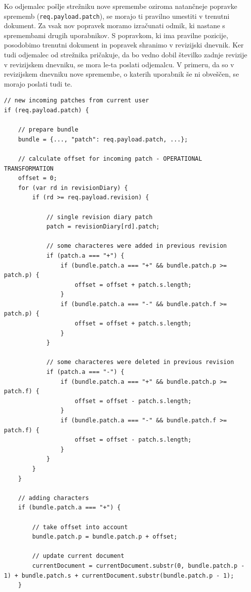 \documentclass[a4paper, 12pt, twoside]{book}
\begin{document}
Ko odjemalec pošlje strežniku nove spremembe oziroma natančneje popravke sprememb ({\tt req.payload.patch}), se morajo ti pravilno umestiti v trenutni dokument. Za vsak nov popravek moramo izračunati odmik, ki nastane s spremembami drugih uporabnikov. S popravkom, ki ima pravilne pozicije, posodobimo trenutni dokument in popravek shranimo v revizijski dnevnik. Ker tudi odjemalec od strežnika pričakuje, da bo vedno dobil številko zadnje revizije v revizijskem dnevniku, se mora le-ta poslati odjemalcu. V primeru, da so v revizijskem dnevniku nove spremembe, o katerih uporabnik še ni obveščen, se morajo poslati tudi te.\newline

\begin{lstlisting}[title={Koda 6.3: Izvajanje Operativne transformacije na strani strežnika.}]
// new incoming patches from current user
if (req.payload.patch) {

    // prepare bundle
    bundle = {..., "patch": req.payload.patch, ...};

    // calculate offset for incoming patch - OPERATIONAL TRANSFORMATION
    offset = 0;
    for (var rd in revisionDiary) {
        if (rd >= req.payload.revision) {

            // single revision diary patch
            patch = revisionDiary[rd].patch;

            // some characteres were added in previous revision
            if (patch.a === "+") {
                if (bundle.patch.a === "+" && bundle.patch.p >= patch.p) {
                    offset = offset + patch.s.length;
                }
                if (bundle.patch.a === "-" && bundle.patch.f >= patch.p) {
                    offset = offset + patch.s.length;
                }
            }

            // some characteres were deleted in previous revision
            if (patch.a === "-") {
                if (bundle.patch.a === "+" && bundle.patch.p >= patch.f) {
                    offset = offset - patch.s.length;
                }
                if (bundle.patch.a === "-" && bundle.patch.f >= patch.f) {
                    offset = offset - patch.s.length;
                }
            }
        }
    }

    // adding characters
    if (bundle.patch.a === "+") {

        // take offset into account
        bundle.patch.p = bundle.patch.p + offset;

        // update current document
        currentDocument = currentDocument.substr(0, bundle.patch.p - 1) + bundle.patch.s + currentDocument.substr(bundle.patch.p - 1);
    }


\end{lstlisting}
\end{document}
